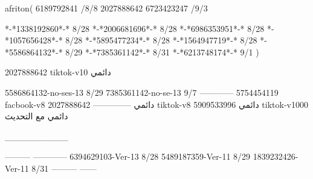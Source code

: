 afriton(
6189792841 /8/8
2027888642
6723423247 /9/3

*-*1338192860*-* 8/28
*-*2006681696*-* 8/28
*-*6986353951*-* 8/28
*-*1057656428*-* 8/28
*-*5895477234*-* 8/28
*-*1564947719*-* 8/28
*-*5586864132*-* 8/29
*-*7385361142*-* 8/31
*-*6213748174*-* 9/1
)

2027888642 tiktok-v10
دائمي

5586864132-no-ses-13
8/29
7385361142-no-se-13
9/7
------------
5754454119 facbook-v8
دائمي
--------------
2027888642 tiktok-v8
دائمي
5909533996 tiktok-v1000
دائمي مع التحديث

__________

---------
------------
6394629103-Ver-13
8/28
5489187359-Ver-11
8/29
1839232426-Ver-11
8/31
---------
------
